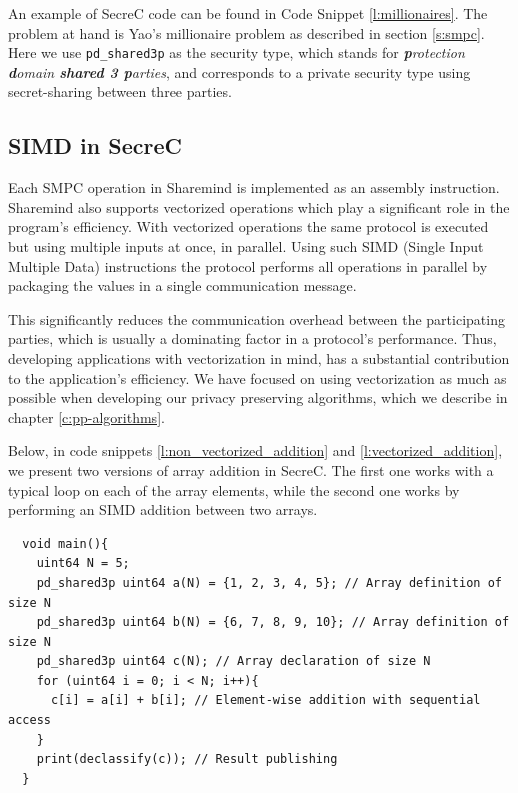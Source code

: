 An example of SecreC code can be found in Code Snippet \ref{l:millionaires}.
The problem at hand is Yao's millionaire problem \cite{yao1982protocols} as described in section \ref{s:smpc}.
Here we use \texttt{pd\_shared3p} as the security type, which stands for \textit{\textbf{p}rotection \textbf{d}omain \textbf{shared 3 p}arties}, and corresponds to a private security type using secret\hyp sharing between three parties.


\subsection{SIMD in SecreC}\label{ss:simd-secrec}

Each SMPC operation in Sharemind is implemented as an assembly instruction.
Sharemind also supports vectorized operations which play a significant role in the program's efficiency.
With vectorized operations the same protocol is executed but using multiple inputs at once, in parallel.
Using such SIMD (Single Input Multiple Data) instructions the protocol performs all operations in parallel by packaging the values in a single communication message.

This significantly reduces the communication overhead between the participating parties, which is usually a dominating factor in a protocol's performance.
Thus, developing applications with vectorization in mind, has a substantial contribution to the application's efficiency.
We have focused on using vectorization as much as possible when developing our privacy preserving algorithms, which we describe in chapter \ref{c:pp-algorithms}.

Below, in code snippets \ref{l:non_vectorized_addition} and \ref{l:vectorized_addition}, we present two versions of array addition in SecreC.
The first one works with a typical loop on each of the array elements, while the second one works by performing an SIMD addition between two arrays.

{
\begin{verbatim}
  void main(){
    uint64 N = 5;
    pd_shared3p uint64 a(N) = {1, 2, 3, 4, 5}; // Array definition of size N
    pd_shared3p uint64 b(N) = {6, 7, 8, 9, 10}; // Array definition of size N
    pd_shared3p uint64 c(N); // Array declaration of size N
    for (uint64 i = 0; i < N; i++){
      c[i] = a[i] + b[i]; // Element-wise addition with sequential access
    }
    print(declassify(c)); // Result publishing
  }
\end{verbatim}
\label{l:non_vectorized_addition}
}

